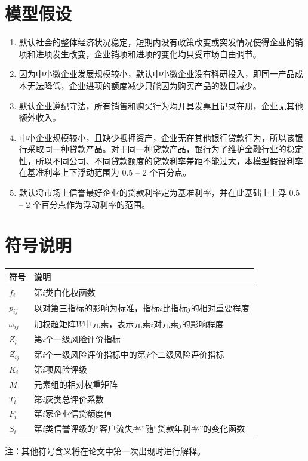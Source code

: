 \documentclass[withoutpreface,bwprint]{cumcmthesis}
\begin{document}
    \section{模型假设}
    \begin{enumerate}
        \item 默认社会的整体经济状况稳定，短期内没有政策改变或突发情况使得企业的销项和进项发生改变，企业销项和进项的变化均只受市场自由调节。
        \item 因为中小微企业发展规模较小，默认中小微企业没有科研投入，即同一产品成本无法降低，企业进项的额度减少只能因为购买产品的数目减少。
        \item 默认企业遵纪守法，所有销售和购买行为均开具发票且记录在册，企业无其他额外收入。
        \item 中小企业规模较小，且缺少抵押资产，企业无在其他银行贷款行为，所以该银行采取同一种贷款产品。对于同一种贷款产品，银行为了维护金融行业的稳定性，所以不同公司、不同贷款额度的贷款利率差距不能过大，本模型假设利率在基准利率上下浮动范围为 0.5 -- 2 个百分点。
        \item 默认将市场上信誉最好企业的贷款利率定为基准利率，并在此基础上上浮 0.5 -- 2 个百分点作为浮动利率的范围。
    \end{enumerate}
    
    \section{符号说明}
    \begin{center}
        \begin{tabular}{>{\centering}p{6em}>{\centering\arraybackslash}p{30em}}
            \toprule
            符号 & 说明 \\
            \midrule
            $f_i$ & 第$i$类白化权函数 \\
            $p_{ij}$ & 以对第三指标的影响为标准，指标$i$比指标$j$的相对重要程度 \\
            $\omega_{ij}$ & 加权超矩阵$W$中元素，表示元素$i$对元素$j$的影响程度\\
            $Z_{i}$ & 第$i$个一级风险评价指标 \\
            $Z_{ij}$ &  第$i$个一级风险评价指标中的第$j$个二级风险评价指标\\
            $K_i$ & 第$i$项风险评级 \\
            $M$ & 元素组的相对权重矩阵 \\
            $T_i$ & 第$i$灰类总评价系数 \\
            $F_i$ & 第$i$家企业信贷额度值 \\
            $S_i$ & 第$i$类信誉评级的``客户流失率''随``贷款年利率''的变化函数 \\
            \bottomrule
        \end{tabular}
    \end{center} 
    注：其他符号含义将在论文中第一次出现时进行解释。
    
\end{document}
